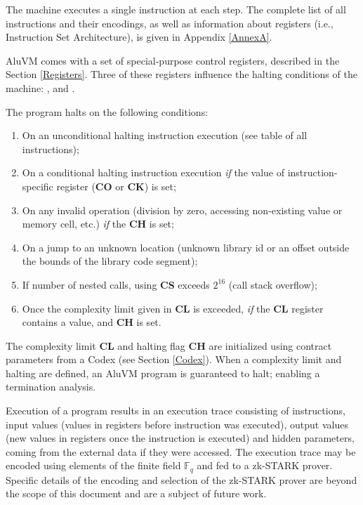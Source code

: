 \documentclass[9pt,oneside]{amsart}
\begin{document}
\begin{multicols}{2}
The machine executes a single instruction at each step.
The complete list of all instructions and their encodings,
as well as information about registers (i.e., Instruction Set Architecture),
is given in Appendix \ref{AnnexA}.

AluVM comes with a set of special-purpose control registers,
described in the Section \ref{Registers}.
Three of these registers influence the halting conditions of the machine:
,  and .

The program halts on the following conditions:

\begin{enumerate}
\item On an unconditional halting instruction execution (see table of all instructions);
\item On a conditional halting instruction execution
   \emph{if} the value of instruction-specific register (\textbf{CO} or \textbf{CK}) is set;
\item On any invalid operation (division by zero, accessing non-existing value or memory cell, etc.)
   \emph{if} the \textbf{CH} is set;
\item On a jump to an unknown location
   (unknown library id or an offset outside the bounds of the library code segment);
\item If number of nested calls, using \textbf{CS} exceeds $2^16$
   (call stack overflow);
\item Once the complexity limit given in \textbf{CL} is exceeded,
   \emph{if} the \textbf{CL} register contains a value, and \textbf{CH} is set.
\end{enumerate}

The complexity limit \textbf{CL} and halting flag \textbf{CH}
are initialized using contract parameters from a Codex (see Section \ref{Codex}).
When a complexity limit and halting are defined, an AluVM program is guaranteed to halt;
enabling a termination analysis.

Execution of a program results in an execution trace consisting of instructions,
input values (values in registers before instruction was executed),
output values (new values in registers once the instruction is executed)
and hidden parameters, coming from the external data if they were accessed.
The execution trace may be encoded using elements of the finite field $\mathbb{F}_q$
and fed to a zk-STARK prover.
Specific details of the encoding and selection of the zk-STARK prover
are beyond the scope of this document and are a subject of future work.


\end{multicols}
\end{document}
